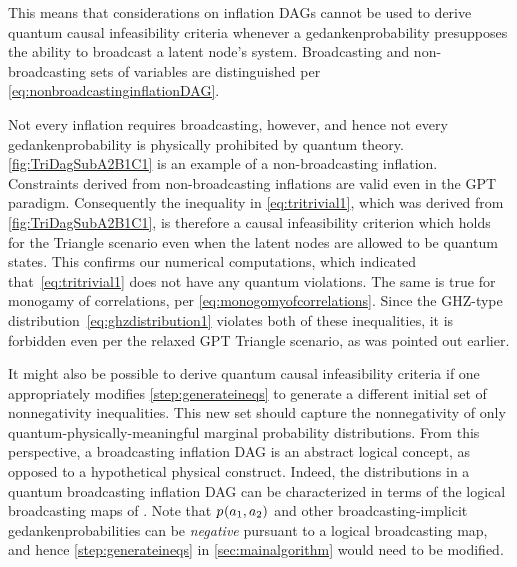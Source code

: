 {This means that considerations on inflation DAGs cannot be used to derive quantum causal infeasibility criteria whenever a gedankenprobability presupposes the ability to broadcast a latent node's system. Broadcasting and non-broadcasting sets of variables are distinguished per \cref{eq:nonbroadcastinginflationDAG}.


Not every inflation requires broadcasting, however, and hence not every gedankenprobability is physically prohibited by quantum theory. 
\cref{fig:TriDagSubA2B1C1} is an example of a non-broadcasting inflation.
Constraints derived from non-broadcasting inflations are valid even in the GPT paradigm. Consequently the inequality in \cref{eq:tritrivial1}, which was derived from \cref{fig:TriDagSubA2B1C1}, is therefore a causal infeasibility criterion which holds for the Triangle scenario even when the latent nodes are allowed to be quantum states. This confirms our numerical computations, which indicated that~\eqref{eq:tritrivial1} does not have any quantum violations. The same is true for monogamy of correlations, per \cref{eq:monogomyofcorrelations}. Since the GHZ-type distribution~\cref{eq:ghzdistribution1} violates both of these inequalities, it is forbidden even per the relaxed GPT Triangle scenario, as was pointed out earlier. 

It might also be possible to derive quantum causal infeasibility criteria if one appropriately modifies \cref{step:generateineqs} to generate a different initial set of nonnegativity inequalities. This new set should capture the nonnegativity of only quantum-physically-meaningful marginal probability distributions. From this perspective, a broadcasting inflation DAG is an abstract logical concept, as opposed to a hypothetical physical construct. Indeed, the distributions in a quantum broadcasting inflation DAG can be characterized in terms of the logical broadcasting maps of \citet{Coecke2011}. Note that ${p_{}}\lparen a_1,a_2\rparen$ and other broadcasting-implicit gedankenprobabilities can be \emph{negative} pursuant to a logical broadcasting map, and hence \cref{step:generateineqs} in \cref{sec:mainalgorithm} would need to be modified.

}
